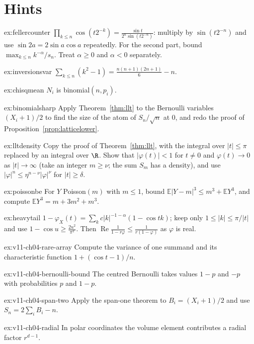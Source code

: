\section{Hints}

\begin{hint}{ex:fellercounter}
$\prod_{k\le n}\cos(t2^{-k})=\frac{\sin t}{2^n\sin(t2^{-n})}$: multiply by $\sin(t2^{-n})$ and use $\sin2a=2\sin a\cos a$ repeatedly. For the second part, bound $\max_{k\le n}k^{-\alpha}/s_n$. Treat $\alpha\ge0$ and $\alpha<0$ separately.
\end{hint}
\begin{hint}{ex:inversionsvar}
$\sum_{k\le n}(k^2-1)=\frac{n(n+1)(2n+1)}6-n$.
\end{hint}
\begin{hint}{ex:chisqmean}
$N_i$ is binomial$(n,p_i)$.
\end{hint}
\begin{hint}{ex:binomialsharp}
Apply Theorem~\ref{thm:llt} to the Bernoulli variables $(X_i+1)/2$ to find the size of the atom of $S_n/\sqrt n$ at $0$, and redo the proof of
Proposition~\ref{prop:latticelower}.
\end{hint}
\begin{hint}{ex:lltdensity}
Copy the proof of Theorem~\ref{thm:llt}, with the integral over $|t|\le\pi$ replaced by an integral over $\R$. Show that $|\varphi(t)|<1$ for $t\ne0$
and $\varphi(t)\to0$ as $|t|\to\infty$ (take an integer $m\ge\nu$; the sum $S_m$ has a density), and use $|\varphi|^n\le\eta^{n-\nu}|\varphi|^\nu$ for $|t|\ge\delta$.
\end{hint}
\begin{hint}{ex:poissonbe}
For $Y$ Poisson$(m)$ with $m\le1$, bound $\mathbb E|Y-m|^3\le m^3+\mathbb EY^3$, and compute $\mathbb EY^3=m+3m^2+m^3$.
\end{hint}
\begin{hint}{ex:heavytail}
$1-\varphi_X(t)=\sum_kc|k|^{-1-\alpha}(1-\cos tk)$; keep only $1\le|k|\le\pi/|t|$ and use $1-\cos u\ge\frac{2u^2}{\pi^2}$. Then $\operatorname{Re}\frac1{1-r\varphi}\le\frac1{r(1-\varphi)}$
as $\varphi$ is real.
\end{hint}

\begin{hint}{ex:v11-ch04-rare-array}
Compute the variance of one summand and its characteristic function $1+(\cos t-1)/n$.
\end{hint}
\begin{hint}{ex:v11-ch04-bernoulli-bound}
The centred Bernoulli takes values $1-p$ and $-p$ with probabilities $p$ and $1-p$.
\end{hint}
\begin{hint}{ex:v11-ch04-span-two}
Apply the span-one theorem to $B_i=(X_i+1)/2$ and use $S_n=2\sum_iB_i-n$.
\end{hint}
\begin{hint}{ex:v11-ch04-radial}
In polar coordinates the volume element contributes a radial factor $r^{d-1}$.
\end{hint}

